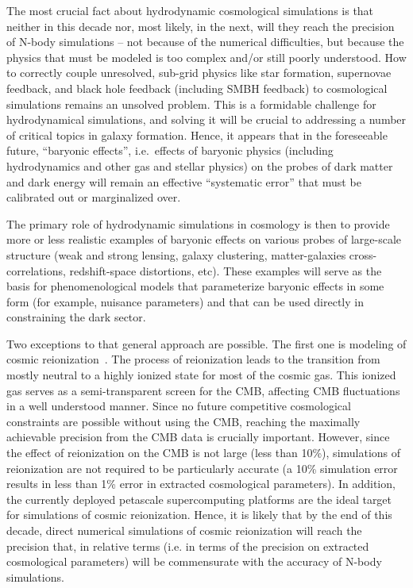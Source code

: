 The most crucial fact about hydrodynamic cosmological simulations is
that neither in this decade nor, most likely, in the next, will they
reach the precision of N-body simulations -- not because of the
numerical difficulties, but because the physics that must be modeled
is too complex and/or still poorly understood. How to correctly couple
unresolved, sub-grid physics like star formation, supernovae feedback,
and black hole feedback (including SMBH feedback) to cosmological
simulations remains an unsolved problem.  This is a formidable
challenge for hydrodynamical simulations, and solving it will be
crucial to addressing a number of critical topics in galaxy formation.
Hence, it appears that in the foreseeable future, ``baryonic
effects'', i.e.\ effects of baryonic physics (including hydrodynamics
and other gas and stellar physics) on the probes of dark matter and
dark energy will remain an effective ``systematic error'' that must be
calibrated out or marginalized over.

The primary role of hydrodynamic simulations in cosmology is then to
provide more or less realistic examples of baryonic effects on various
probes of large-scale structure (weak and strong lensing, galaxy
clustering, matter-galaxies cross-correlations, redshift-space
distortions, etc). These examples will serve as the basis for
phenomenological models that parameterize baryonic effects in some
form (for example, nuisance parameters) and that can be used directly
in constraining the dark sector.

Two exceptions to that general approach are possible. The first one is
modeling of cosmic reionization~\cite{cosreion}. The process of
reionization leads to the transition from mostly neutral to a highly
ionized state for most of the cosmic gas. This ionized gas serves as a
semi-transparent screen for the CMB, affecting CMB fluctuations in a
well understood manner. Since no future competitive cosmological
constraints are possible without using the CMB, reaching the maximally
achievable precision from the CMB data is crucially
important. However, since the effect of reionization on the CMB is not
large (less than 10\%), simulations of reionization are not required
to be particularly accurate (a 10\% simulation error results in less
than 1\% error in extracted cosmological parameters). In addition, the
currently deployed petascale supercomputing platforms are the ideal
target for simulations of cosmic reionization. Hence, it is likely
that by the end of this decade, direct numerical simulations of cosmic
reionization will reach the precision that, in relative terms (i.e. in
terms of the precision on extracted cosmological parameters) will be
commensurate with the accuracy of N-body simulations.

